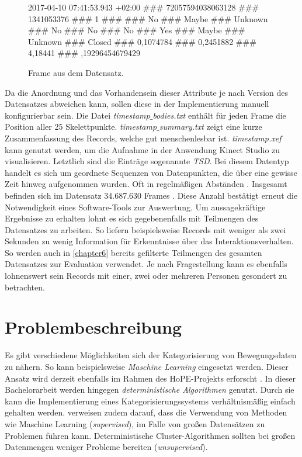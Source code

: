 \begin{center}
\begin{figure}[ht]
    2017-04-10 07:41:53.943 +02:00 \#\#\# 72057594038063128 \#\#\# 1341053376 \#\#\# 1 \#\#\#
     \#\#\# No \#\#\# Maybe \#\#\# Unknown \#\#\# No \#\#\# No \#\#\# No \#\#\# Yes \#\#\#
    \newline Maybe \#\#\# Unknown \#\#\# Closed \#\#\# 0,1074784 \#\#\# 0,2451882 \#\#\# 4,18441 \#\#\#
    ,19296454679429
    \caption{Frame aus dem Datensatz.}
    \label{fig:FrameExample}
  \end{figure}
\end{center}

Da die Anordnung und das Vorhandensein dieser Attribute je nach Version des Datensatzes abweichen kann,
sollen diese in der Implementierung manuell konfigurierbar sein.
Die Datei \emph{timestamp$\_$bodies.txt} enthält für jeden Frame die Position aller 25 Skelettpunkte.
\emph{timestamp$\_$summary.txt} zeigt eine kurze Zusammenfassung des Records, welche gut menschenlesbar ist.
\emph{timestamp.xef} kann genutzt werden, um die Aufnahme in der Anwendung Kinect Studio zu visualisieren.
Letztlich sind die Einträge sogenannte \emph{\ac{TSD}}.
Bei diesem Datentyp handelt es sich um geordnete Sequenzen von Datenpunkten,
die über eine gewisse Zeit hinweg aufgenommen wurden.
Oft in regelmäßigen Abständen \citep{ali_clustering_2019}.
Insgesamt befinden sich im Datensatz 34.687.630 Frames \citep{temiz_konzeption_2022}.
Diese Anzahl bestätigt erneut die Notwendigkeit eines Software-Tools zur Auswertung.
Um aussagekräftige Ergebnisse zu erhalten lohnt es sich gegebenenfalls mit Teilmengen des Datensatzes zu arbeiten.
So liefern beispielsweise Records mit weniger als zwei Sekunden zu wenig Information
für Erkenntnisse über das Interaktionsverhalten.
So werden auch in \autoref{chapter6} bereits gefilterte Teilmengen des gesamten Datensatzes
zur Evaluation verwendet.
Je nach Fragestellung kann es ebenfalls lohnenswert sein Records mit einer, zwei oder mehreren Personen
gesondert zu betrachten.

\section{Problembeschreibung}
\label{2-Problembeschreibung}
Es gibt verschiedene Möglichkeiten sich der Kategorisierung von Bewegungsdaten zu nähern.
So kann beispielsweise \emph{Maschine Learning} eingesetzt werden.
Dieser Ansatz wird derzeit ebenfalls im Rahmen des HoPE-Projekts erforscht \citep{plischke_master_2022}.
In dieser Bachelorarbeit werden hingegen \emph{deterministische Algorithmen} genutzt.
Durch sie kann die Implementierung eines Kategorisierungssystems verhältnismäßig einfach gehalten werden.
\citet{aghabozorgi_time-series_2015} verweisen zudem darauf, dass die Verwendung von Methoden
wie Maschine Learning (\emph{supervised}), im Falle von großen Datensätzen zu Problemen führen kann.
Deterministische Cluster-Algorithmen sollten bei großen Datenmengen weniger Probleme bereiten (\emph{unsupervised}).

